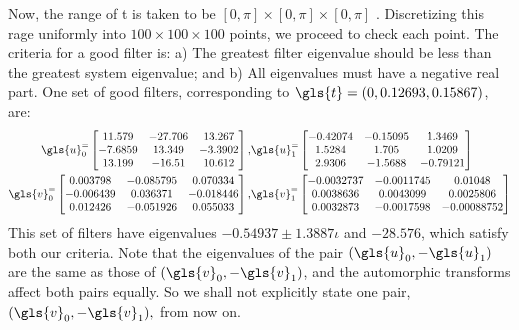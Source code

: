 Now, the range of \gls{t} is taken to be $[0, \pi] \times [0, \pi] \times [0, \pi]$ \citep[App.~C]{Jiffri2011}. Discretizing this rage uniformly into $100 \times 100 \times 100$ points, we proceed to check each point. The criteria for a good filter is: a) The greatest filter eigenvalue should be less than the greatest system eigenvalue; and b) All eigenvalues must have a negative real part. One set of good filters, corresponding to $\gls{t} = (0, 0.12693, 0.15867)$, are:
\begin{align}
\gls{u}_0^ = \begin{bmatrix}	
       11.579   &   -27.706  &     13.267\\
      -7.6859   &    13.349  &    -3.3902\\
       13.199   &    -16.51  &     10.612
	\end{bmatrix}, &
\gls{u}_1^ = \begin{bmatrix}
     -0.42074   &  -0.15095  &     1.3469\\
       1.5284   &     1.705  &     1.0209\\
       2.9306   &   -1.5688  &   -0.79121
	\end{bmatrix}\\
\gls{v}_0^ = \begin{bmatrix}
     0.003798  &  -0.085795 &    0.070334\\
    -0.006439  &   0.036371 &   -0.018446\\
     0.012426  &  -0.051926 &    0.055033	
	\end{bmatrix}, &
\gls{v}_1^ = \begin{bmatrix}
   -0.0032737 &  -0.0011745 &     0.01048\\
    0.0038636 &   0.0043099 &   0.0025806\\
    0.0032873 &  -0.0017598 & -0.00088752
	\end{bmatrix}
\end{align}
This set of filters have eigenvalues $-0.54937 \pm 1.3887\iota$ and 
$-28.576$, which satisfy both our criteria. Note that the eigenvalues of 
the pair $(\gls{u}_0, -\gls{u}_1)$ are the same as those of 
$(\gls{v}_0, -\gls{v}_1)$, and the automorphic transforms affect both 
pairs equally. So we shall not explicitly state one pair, 
$(\gls{v}_0, -\gls{v}_1),$ from now on.


